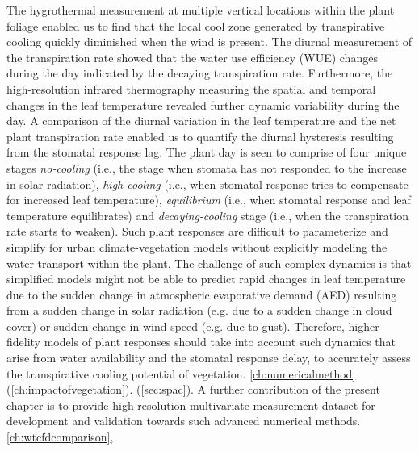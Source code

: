 The hygrothermal measurement at multiple vertical locations within the plant foliage enabled us to find that the local cool zone generated by transpirative cooling quickly diminished when the wind is present. The diurnal measurement of the transpiration rate showed that the water use efficiency (WUE) changes during the day indicated by the decaying transpiration rate. Furthermore, the high-resolution infrared thermography measuring the spatial and temporal changes in the leaf temperature revealed further dynamic variability during the day. A comparison of the diurnal variation in the leaf temperature and the net plant transpiration rate enabled us to quantify the diurnal hysteresis resulting from the stomatal response lag. The plant day is seen to comprise of four unique stages \textit{no-cooling} (i.e., the stage when stomata has not responded to the increase in solar radiation),\textit{ high-cooling} (i.e., when stomatal response tries to compensate for increased leaf temperature), \textit{equilibrium} (i.e., when stomatal response and leaf temperature equilibrates) and \textit{decaying-cooling} stage (i.e., when the transpiration rate starts to weaken). Such plant responses are difficult to parameterize and simplify for urban climate-vegetation models without explicitly modeling the water transport within the plant. The challenge of such complex dynamics is that simplified models might not be able to predict rapid changes in leaf temperature due to the sudden change in atmospheric evaporative demand (AED) resulting from a sudden change in solar radiation (e.g. due to a sudden change in cloud cover) or sudden change in wind speed (e.g. due to gust). Therefore, higher-fidelity models of plant responses should take into account such dynamics that arise from water availability and the stomatal response delay, to accurately assess the transpirative cooling potential of vegetation. \cref{ch:numericalmethod} (\cref{ch:impactofvegetation}).  (\cref{sec:spac}). A further contribution of the present chapter is to provide high-resolution multivariate measurement dataset for development and validation towards such advanced numerical methods.  \cref{ch:wtcfdcomparison}, 
